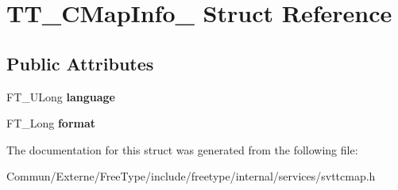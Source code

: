 \hypertarget{struct_t_t___c_map_info__}{}\section{T\+T\+\_\+\+C\+Map\+Info\+\_\+ Struct Reference}
\label{struct_t_t___c_map_info__}
\subsection*{Public Attributes}
\begin{DoxyCompactItemize}
\item 
F\+T\+\_\+\+U\+Long {\bfseries language}\hypertarget{struct_t_t___c_map_info___a4096f460af57f87cb9434a411c502d86}{}\label{struct_t_t___c_map_info___a4096f460af57f87cb9434a411c502d86}

\item 
F\+T\+\_\+\+Long {\bfseries format}\hypertarget{struct_t_t___c_map_info___a122d56b4755597f134fcf4865cb0a4fc}{}\label{struct_t_t___c_map_info___a122d56b4755597f134fcf4865cb0a4fc}

\end{DoxyCompactItemize}


The documentation for this struct was generated from the following file\+:\begin{DoxyCompactItemize}
\item 
Commun/\+Externe/\+Free\+Type/include/freetype/internal/services/svttcmap.\+h\end{DoxyCompactItemize}
